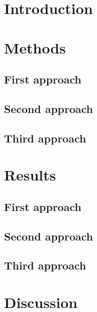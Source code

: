 \documentclass[11pt]{article}
\begin{document}
 
\tableofcontents
 
\section{Introduction}
\blindtext\blindtext
\section{Methods}
\subsection{First approach}
\blindtext
\subsection{Second approach}
\blindtext
\subsection{Third approach}
\blindtext
\section{Results}
\subsection{First approach}
\blindtext\blindtext
\subsection{Second approach}
\blindtext\blindtext
\subsection{Third approach}
\blindtext\blindtext
\section{Discussion}
\blindtext\blindtext
\end{document}
